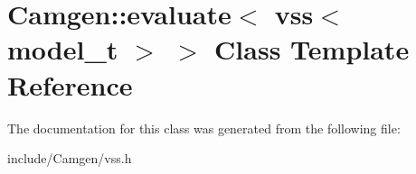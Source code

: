 \hypertarget{a00209}{}\section{Camgen\+:\+:evaluate$<$ vss$<$ model\+\_\+t $>$ $>$ Class Template Reference}
\label{a00209}


The documentation for this class was generated from the following file\+:\begin{DoxyCompactItemize}
\item 
include/\+Camgen/vss.\+h\end{DoxyCompactItemize}
